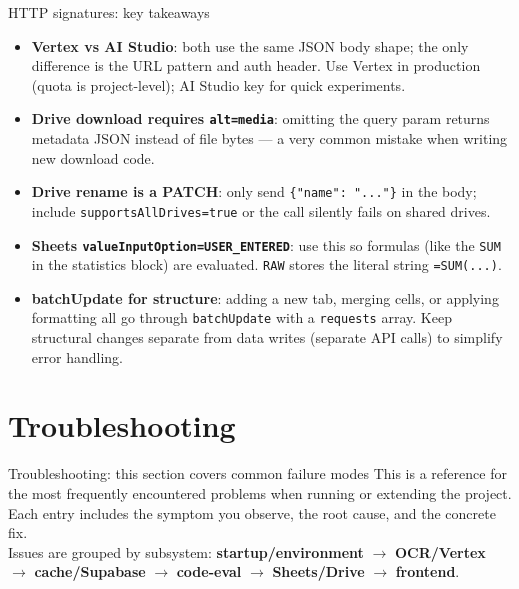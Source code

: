 \documentclass[aspectratio=169]{beamer}
\begin{document}
\begin{frame}{HTTP signatures: key takeaways}
  \small
  \begin{itemize}\setlength\itemsep{0.3em}
    \item \textbf{Vertex vs AI Studio}: both use the same JSON body shape; the only difference is the URL pattern and auth header. Use Vertex in production (quota is project-level); AI Studio key for quick experiments.
    \item \textbf{Drive download requires \texttt{alt=media}}: omitting the query param returns metadata JSON instead of file bytes --- a very common mistake when writing new download code.
    \item \textbf{Drive rename is a PATCH}: only send \texttt{\{"name": "..."\}} in the body; include \texttt{supportsAllDrives=true} or the call silently fails on shared drives.
    \item \textbf{Sheets \texttt{valueInputOption=USER\_ENTERED}}: use this so formulas (like the \texttt{SUM} in the statistics block) are evaluated. \texttt{RAW} stores the literal string \texttt{=SUM(...)}.
    \item \textbf{batchUpdate for structure}: adding a new tab, merging cells, or applying formatting all go through \texttt{batchUpdate} with a \texttt{requests} array. Keep structural changes separate from data writes (separate API calls) to simplify error handling.
  \end{itemize}
\end{frame}

\section{Troubleshooting}

\begin{frame}{Troubleshooting: this section covers common failure modes}
  \small
  This is a reference for the most frequently encountered problems when running or extending the project.
  Each entry includes the symptom you observe, the root cause, and the concrete fix.\\[0.4em]
  Issues are grouped by subsystem: \textbf{startup/environment} $\rightarrow$ \textbf{OCR/Vertex} $\rightarrow$ \textbf{cache/Supabase} $\rightarrow$ \textbf{code-eval} $\rightarrow$ \textbf{Sheets/Drive} $\rightarrow$ \textbf{frontend}.
\end{frame}
\end{document}
